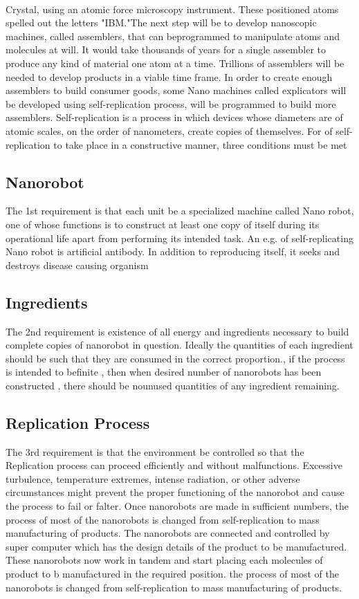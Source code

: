 \documentclass{article}
\begin{document}
\\Crystal, using an atomic force microscopy instrument. These positioned atoms spelled out the letters "IBM."The next step will be to develop nanoscopic machines, called assemblers, that can beprogrammed to manipulate atoms and molecules at will. It would take thousands of years for a single assembler to produce any kind of material one atom at a time. Trillions of assemblers will be needed to develop products in a viable time frame. In order to create enough assemblers to build consumer goods, some Nano machines called explicators will be developed using self-replication process, will be programmed to build more assemblers. Self-replication is a process in which devices whose diameters are of atomic scales, on the order of nanometers, create copies of themselves. For of self-replication to take place in a constructive manner, three conditions must be met

\subsection{Nanorobot}
The 1st requirement is that each unit be a specialized machine called Nano robot, one of whose functions is to construct at least one copy of itself during its operational life apart from performing its intended task. An e.g. of self-replicating Nano robot is artificial antibody. In addition to reproducing itself, it seeks and destroys disease causing organism

\subsection{Ingredients}
The 2nd requirement is existence of all energy and ingredients necessary to build complete copies of nanorobot in question. Ideally the quantities of each ingredient should be such that they are consumed in the correct proportion., if the process is intended to befinite , then when desired number of nanorobots has been constructed , there should be nounused quantities of any ingredient remaining.

\subsection{Replication Process}

The 3rd requirement is that the environment be controlled so that the Replication process can proceed efficiently and without malfunctions. Excessive turbulence, temperature extremes, intense radiation, or other adverse circumstances might prevent the proper functioning of the nanorobot and cause the process to fail or falter. Once nanorobots are made in sufficient numbers, the process of most of the nanorobots is changed from self-replication to mass manufacturing of products. The nanorobots are connected and controlled by super computer which has the design details of the product to be manufactured. These nanorobots now work in tandem and start placing each molecules of product to b manufactured in the required position. the process of most of the nanorobots is changed from self-replication to mass manufacturing of products.
\end{document}
